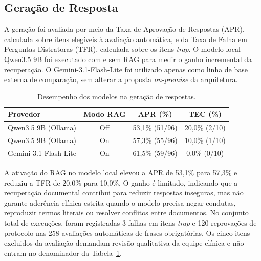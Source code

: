 \documentclass[12pt]{article}
\begin{document}
\subsection{Geração de Resposta}

A geração foi avaliada por meio da Taxa de Aprovação de Respostas (APR), calculada sobre itens elegíveis à avaliação automática, e da Taxa de Falha em Perguntas Distratoras (TFR), calculada sobre os itens \textit{trap}. O modelo local Qwen3.5 9B foi executado com e sem RAG para medir o ganho incremental da recuperação.
O Gemini-3.1-Flash-Lite foi utilizado apenas como linha de base externa de comparação, sem alterar a proposta \textit{on-premise} da arquitetura.

\begin{table}[H]
  \centering
  \caption{Desempenho dos modelos na geração de respostas.}
  \label{tab:apr_tfr_providers}
  \small
  \begin{tabular}{lccc}
  	\toprule
  	\textbf{Provedor}           & \textbf{Modo RAG} & \textbf{APR (\%)} & \textbf{TEC (\%)} \\
  	\midrule
  	Qwen3.5 9B (Ollama)         & Off               & 53,1\% (51/96)    & 20,0\% (2/10)     \\
	  Qwen3.5 9B (Ollama)         & On                & 57,3\% (55/96)    & 10,0\% (1/10)     \\
  	Gemini-3.1-Flash-Lite       & On                & 61,5\% (59/96)    & 0,0\% (0/10)      \\
  	\bottomrule
  \end{tabular}
  \end{table}

A ativação do RAG no modelo local elevou a APR de 53,1\% para 57,3\% e reduziu a TFR de 20,0\% para 10,0\%.
O ganho é limitado, indicando que a recuperação documental contribui para reduzir respostas inseguras, mas não garante aderência clínica estrita quando o modelo precisa negar condutas, reproduzir termos literais ou resolver conflitos entre documentos.
No conjunto total de execuções, foram registradas 3 falhas em itens \textit{trap} e 120 reprovações de protocolo nas 258 avaliações automáticas de frases obrigatórias.
Os cinco itens excluidos da avaliação demandam revisão qualitativa da equipe clínica e não entram no denominador da Tabela~\ref{tab:apr_tfr_providers}.

\end{document}
